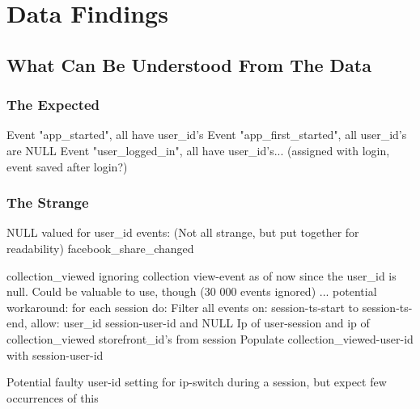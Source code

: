 


\section{Data Findings}
\subsection{What Can Be Understood From The Data}



\subsubsection{The Expected}
Event "app\_started", all have user\_id's
Event "app\_first\_started", all user\_id's are NULL
Event "user\_logged\_in", all have user\_id's... (assigned with login, event saved after login?)

\subsubsection{The Strange}
NULL valued  for user\_id events: (Not all strange, but put together for readability)
facebook\_share\_changed

collection\_viewed  ignoring collection view-event as of now since the user\_id
is null. Could be valuable to use, though (30 000 events ignored) ...
potential workaround:
    for each session do:
        Filter all events on:
            session-ts-start to session-ts-end,
            allow: user\_id session-user-id and NULL
            Ip of user-session and ip of collection\_viewed
            storefront\_id's from session
                Populate collection\_viewed-user-id with session-user-id

Potential faulty user-id setting for ip-switch during a session, but expect few
occurrences of this

